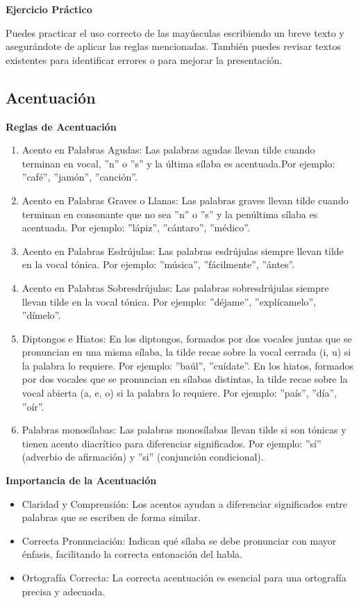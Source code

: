 \textbf{Ejercicio Práctico}

Puedes practicar el uso correcto de las mayúsculas escribiendo un breve texto y asegurándote de aplicar las reglas mencionadas. También puedes revisar textos existentes para identificar errores o para mejorar la presentación.

\subsection{Acentuación}

\textbf{Reglas de Acentuación}

\begin{enumerate}
      \item Acento en Palabras Agudas: Las palabras agudas llevan tilde cuando terminan en vocal, ''n'' o ''s'' y la última sílaba es acentuada.Por ejemplo: ''café'', ''jamón'', ''canción''.
      \item Acento en Palabras Graves o Llanas: Las palabras graves llevan tilde cuando terminan en consonante que no sea ''n'' o ''s'' y la penúltima sílaba es acentuada. Por ejemplo: ''lápiz'', ''cántaro'', ''médico''.
      \item Acento en Palabras Esdrújulas: Las palabras esdrújulas siempre llevan tilde en la vocal tónica. Por ejemplo: ''música'', ''fácilmente'', ''ántes''.
      \item Acento en Palabras Sobresdrújulas: Las palabras sobresdrújulas siempre llevan tilde en la vocal tónica. Por ejemplo: ''déjame'', ''explícamelo'', ''dímelo''.
      \item Diptongos e Hiatos: En los diptongos, formados por dos vocales juntas que se pronuncian en una misma sílaba, la tilde recae sobre la vocal cerrada (i, u) si la palabra lo requiere. Por ejemplo: ''baúl'', ''cuídate''. En los hiatos, formados por dos vocales que se pronuncian en sílabas distintas, la tilde recae sobre la vocal abierta (a, e, o) si la palabra lo requiere. Por ejemplo: ''país'', ''día'', ''oír''.
      \item Palabras monosílabas: Las palabras monosílabas llevan tilde si son tónicas y tienen acento diacrítico para diferenciar significados. Por ejemplo: ''sí'' (adverbio de afirmación) y ''si'' (conjunción condicional).
\end{enumerate}

\textbf{Importancia de la Acentuación}

\begin{itemize}
      \item Claridad y Comprensión: Los acentos ayudan a diferenciar significados entre palabras que se escriben de forma similar.
      \item Correcta Pronunciación: Indican qué sílaba se debe pronunciar con mayor énfasis, facilitando la correcta entonación del habla.
      \item Ortografía Correcta: La correcta acentuación es esencial para una ortografía precisa y adecuada.
\end{itemize}

